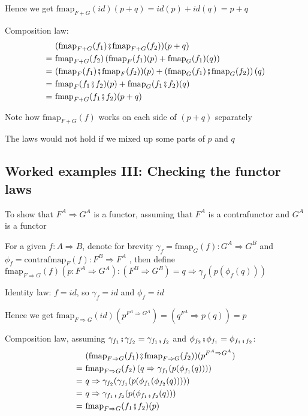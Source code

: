 Hence we get $\text{fmap}_{F+G}(id)(p+q)=id(p)+id(q)=p+q$

Composition law: 
\begin{align*}
 & (\text{fmap}_{F+G}(f_{1})\bef\text{fmap}_{F+G}(f_{2}))(p+q)\\
=\  & \text{fmap}_{F+G}(f_{2})\left(\text{fmap}_{F}(f_{1})(p)+\text{fmap}_{G}(f_{1})(q)\right)\\
=\  & (\text{fmap}_{F}(f_{1})\bef\text{fmap}_{F}(f_{2}))(p)+\left(\text{fmap}_{G}(f_{1})\bef\text{fmap}_{G}(f_{2})\right)(q)\\
=\  & \text{fmap}_{F}(f_{1}\bef f_{2})(p)+\text{fmap}_{G}(f_{1}\bef f_{2})(q)\\
=\  & \text{fmap}_{F+G}(f_{1}\bef f_{2})(p+q)
\end{align*}

Note how $\text{fmap}_{F+G}(f)$ works on each side of $\left(p+q\right)$
separately

The laws would not hold if we mixed up some parts of $p$ and $q$


\subsection{Worked examples III: Checking the functor laws}

To show that $F^{A}\Rightarrow G^{A}$ is a functor, assuming that
$F^{A}$ is a contrafunctor and $G^{A}$ is a functor

For a given $f:A\Rightarrow B$, denote for brevity $\gamma_{f}=\text{fmap}_{G}(f):G^{A}\Rightarrow G^{B}$
and $\phi_{f}=\text{contrafmap}_{F}(f):F^{B}\Rightarrow F^{A}$ ,
then define $\text{fmap}_{F\Rightarrow G}(f)(p:F^{A}\Rightarrow G^{A}):\left(F^{B}\Rightarrow G^{B}\right)=q\Rightarrow\gamma_{f}(p(\phi_{f}(q)))$

Identity law: $f=id$, so $\gamma_{f}=id$ and $\phi_{f}=id$

Hence we get $\text{fmap}_{F\Rightarrow G}(id)(p^{F^{A}\Rightarrow G^{A}})=\left(q^{F^{A}}\Rightarrow p(q)\right)=p$

Composition law, assuming $\gamma_{f_{1}}\bef\gamma_{f_{2}}=\gamma_{f_{1}\bef f_{2}}$
and $\phi_{f_{2}}\bef\phi_{f_{1}}=\phi_{f_{1}\bef f_{2}}$: 
\begin{align*}
 & (\text{fmap}_{F\Rightarrow G}(f_{1})\bef\text{fmap}_{F\Rightarrow G}(f_{2}))(p^{F^{A}\Rightarrow G^{A}})\\
=\  & \text{fmap}_{F\Rightarrow G}(f_{2})\left(q\Rightarrow\gamma_{f_{1}}(p(\phi_{f_{1}}(q)))\right)\\
=\  & q\Rightarrow\gamma_{f_{2}}(\gamma_{f_{1}}(p(\phi_{f_{1}}(\phi_{f_{2}}(q)))))\\
=\  & q\Rightarrow\gamma_{f_{1}\bef f_{2}}(p(\phi_{f_{1}\bef f_{2}}(q)))\\
=\  & \text{fmap}_{F\Rightarrow G}(f_{1}\bef f_{2})(p)
\end{align*}

